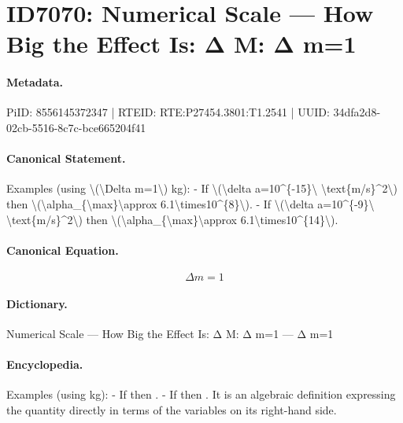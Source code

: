\section*{ID7070: Numerical Scale — How Big the Effect Is: Δ M: Δ m=1}
\paragraph{Metadata.}
PiID: 8556145372347 | RTEID: RTE:P27454.3801:T1.2541 | UUID: 34dfa2d8-02cb-5516-8c7c-bce665204f41

\paragraph{Canonical Statement.}
Examples (using \textbackslash{}(\textbackslash{}Delta m=1\textbackslash{}) kg): - If \textbackslash{}(\textbackslash{}delta a=10\textasciicircum{}\{-15\}\textbackslash{} \textbackslash{}text\{m/s\}\textasciicircum{}2\textbackslash{}) then \textbackslash{}(\textbackslash{}alpha\_\{\textbackslash{}max\}\textbackslash{}approx 6.1\textbackslash{}times10\textasciicircum{}\{8\}\textbackslash{}). - If \textbackslash{}(\textbackslash{}delta a=10\textasciicircum{}\{-9\}\textbackslash{} \textbackslash{}text\{m/s\}\textasciicircum{}2\textbackslash{}) then \textbackslash{}(\textbackslash{}alpha\_\{\textbackslash{}max\}\textbackslash{}approx 6.1\textbackslash{}times10\textasciicircum{}\{14\}\textbackslash{}).

\paragraph{Canonical Equation.}
\[
\Delta m=1
\]

\paragraph{Dictionary.}
Numerical Scale — How Big the Effect Is: Δ M: Δ m=1 — Δ m=1

\paragraph{Encyclopedia.}
Examples (using kg): - If then . - If then . It is an algebraic definition expressing the quantity directly in terms of the variables on its right-hand side.
